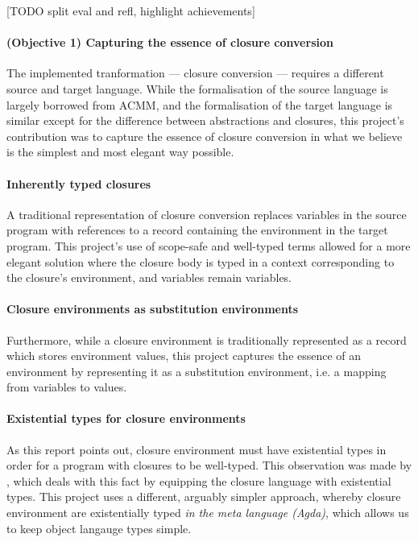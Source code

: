 \documentclass[bsc,frontabs,oneside,singlespacing,parskip,deptreport]{infthesis}
\theoremstyle{definition}
\theoremstyle{lemma}
\begin{document}
[TODO split eval and refl, highlight achievements]

\paragraph{(Objective 1) Capturing the essence of closure conversion}
The implemented tranformation --- closure conversion --- requires a
different source and target language. While the formalisation of the
source language is largely borrowed from ACMM, and the formalisation
of the target language is similar except for the difference between
abstractions and closures, this project's contribution was to capture
the essence of closure conversion in what we believe is the simplest
and most elegant way possible.

\paragraph{Inherently typed closures}
A traditional representation of closure conversion replaces variables
in the source program with references to a record containing the
environment in the target program. This project's use of scope-safe
and well-typed terms allowed for a more elegant solution where the
closure body is typed in a context corresponding to the closure's
environment, and variables remain variables.

\paragraph{Closure environments as substitution environments}
Furthermore, while a closure environment is traditionally represented
as a record which stores environment values, this project captures the
essence of an environment by representing it as a substitution
environment, i.e. a mapping from variables to values.

\paragraph{Existential types for closure environments}
As this report points out, closure environment must have existential
types in order for a program with closures to be well-typed. This
observation was made by \cite{DBLP:conf/popl/MinamideMH96}, which
deals with this fact by equipping the closure language with
existential types. This project uses a different, arguably simpler
approach, whereby closure environment are existentially typed
\textit{in the meta language (Agda)}, which allows us to keep object
langauge types simple.
\end{document}

